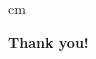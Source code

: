 \documentclass[
aspectratio=3218, 
10pt
]{beamer}
\theoremstyle{plain}
\theoremstyle{remark}
\begin{document}
%
%
\begin{frame}
\thispagestyle{empty}
 cm
\vspace*{\fill}
\begin{center}
\huge \textbf{Thank you!} \smiley{}
\end{center}
\vspace*{\fill}
\end{frame}
\end{document}
